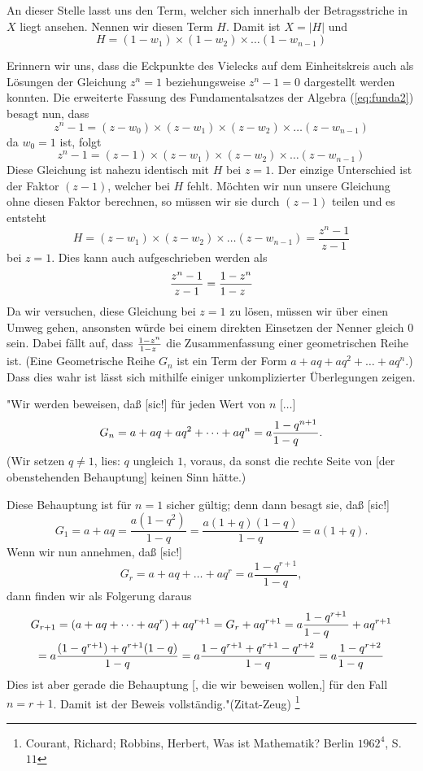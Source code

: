 \documentclass[a4paper,12pt]{article} %
\begin{document}
An dieser Stelle lasst uns den Term, welcher sich innerhalb der Betragsstriche in $X$ liegt ansehen.
Nennen wir diesen Term $H$. Damit ist $X=|H|$ und
\begin{equation}\label{H}
	H=(1-w_1)\times(1-w_2)\times\dots(1-w_{n-1})
\end{equation}

Erinnern wir uns, dass die Eckpunkte des Vielecks auf dem Einheitskreis auch als Lösungen der Gleichung $z^n=1$ beziehungsweise $z^n-1=0$ dargestellt werden konnten. Die erweiterte Fassung des Fundamentalsatzes der Algebra (\ref{eq:funda2}) besagt nun, dass %
\[z^n-1=(z-w_0)\times(z-w_1)\times(z-w_2)\times\dots(z-w_{n-1})\]
da $w_0=1$ ist, folgt
\[z^n-1=(z-1)\times(z-w_1)\times(z-w_2)\times\dots(z-w_{n-1})\]
Diese Gleichung ist nahezu identisch mit $H$ bei $z=1$.
Der einzige Unterschied ist der Faktor $(z-1)$, welcher bei $H$ fehlt.
Möchten wir nun unsere Gleichung ohne diesen Faktor berechnen, so müssen wir sie durch $(z-1)$ teilen und es entsteht
\begin{equation}\label{frac}
	H=(z-w_1)\times(z-w_2)\times\dots(z-w_{n-1})=\frac{z^n-1}{z-1}
\end{equation}
bei $z=1$. Dies kann auch aufgeschrieben werden als
\[\frac{z^n-1}{z-1}=\frac{1-z^n}{1-z\hspace{2mm}}\]
Da wir versuchen, diese Gleichung bei $z=1$ zu lösen, müssen wir über einen Umweg gehen, ansonsten würde bei einem direkten Einsetzen der Nenner gleich $0$ sein.
Dabei fällt auf, dass $\frac{1-z^n}{1-z\hspace{1mm}}$ die Zusammenfassung einer geometrischen Reihe ist.
(Eine Geometrische Reihe $G_n$ ist ein Term der Form $a+aq+aq^2+\dots+aq^n$.)
Dass dies wahr ist lässt sich mithilfe einiger unkomplizierter Überlegungen zeigen.

"Wir werden beweisen, daß [sic!] für jeden Wert von $n$ [$\dots$]
\begin{equation}
	G_n=a+aq+aq^2+\dots+aq^n=a\frac{1-q^{n+1}}{1-q\hspace{6mm}}.
\end{equation} 
(Wir setzen $q\ne1$, lies: $q$ ungleich $1$, voraus, da sonst die rechte Seite von [der obenstehenden Behauptung] keinen Sinn hätte.)

Diese Behauptung ist für $n=1$ sicher gültig; denn dann besagt sie, daß [sic!]
\[G_1=a+aq=\frac{a(1-q^2)}{1-q}=\frac{a(1+q)(1-q)}{1-q}=a(1+q).\]
Wenn wir nun annehmen, daß [sic!]
\[G_r=a+aq+\dots+aq^r=a\frac{1-q^{r+1}}{1-q},\]
dann finden wir als Folgerung daraus
\begin{multline}
	G_{r+1}=(a+aq+\dots+aq^r)+aq^{r+1}=G_r+aq^{r+1}=a\frac{1-q^{r+1}}{1-q\hspace{6mm}}+aq^{r+1}\\
	=a\frac{(1-q^{r+1})+q^{r+1}(1-q)}{1-q}=a\frac{1-q^{r+1}+q^{r+1}-q^{r+2}}{1-q}=a\frac{1-q^{r+2}}{1-q\hspace{6mm}}
\end{multline}
Dies ist aber gerade die Behauptung [, die wir beweisen wollen,] für den Fall $n=r+1$. Damit ist der Beweis vollständig."(Zitat-Zeug)
\footnote{Courant, Richard; Robbins, Herbert, Was ist Mathematik? Berlin $1962^4$, S. $11$}
\end{document}
